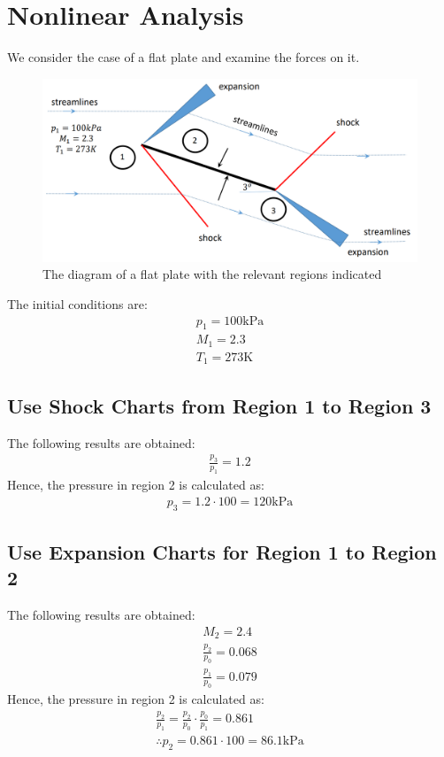 \section{Nonlinear Analysis}
We consider the case of a flat plate and examine the forces on it.
\begin{figure}[H]
    \centering
    \includegraphics[width = 0.9 \textwidth]{./img/diagram32.png}
    \caption{The diagram of a flat plate with the relevant regions indicated}
\end{figure}
The initial conditions are:
\begin{gather}
    p_1 = 100\si{\kilo\pascal} \\[5pt]
    M_1 = 2.3 \\[5pt]
    T_1 = 273\si{\kelvin}
\end{gather}
\subsection{Use Shock Charts from Region 1 to Region 3}
The following results are obtained:
\begin{gather}
    \frac{p_3}{p_1} = 1.2
\end{gather}
Hence, the pressure in region 2 is calculated as:
\begin{gather}
    p_3 = 1.2\cdot 100 = 120\si{\kilo\pascal}
\end{gather}
\subsection{Use Expansion Charts for Region 1 to Region 2}
The following results are obtained:
\begin{gather}
    M_2 = 2.4 \\[5pt]
    \frac{p_2}{p_0} = 0.068 \\[5pt]
    \frac{p_1}{p_0} = 0.079
\end{gather}
Hence, the pressure in region 2 is calculated as:
\begin{gather}
    \frac{p_2}{p_1} = \frac{p_2}{p_0}\cdot \frac{p_0}{p_1} = 0.861 \\[5pt]
    \therefore p_2 = 0.861\cdot 100 = 86.1\si{\kilo\pascal}
\end{gather}
